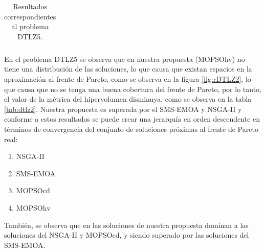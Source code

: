 \begin{table}
\begin{center}
\begin{tabular}{|l|cc|cc|}
	\end{tabular}
\caption{Resultados correspondientes al problema DTLZ5.}
  \label{tab:dtlz5}
\end{center}
\end{table}

En el problema DTLZ5 se observa que en nuestra propuesta (MOPSOhv) no tiene una distribuci\'on de las soluciones, lo que causa que existan 
espacios en la aproximaci\'on al frente de Pareto, como se observa en la figura \ref{fig:rDTLZ2}, lo que causa que no se tenga una buena 
cobertura del frente de Pareto, por lo tanto, el valor de la m\'etrica del hipervolumen disminuya, como se observa en la tabla \ref{tab:dtlz2}. 
Nuestra propuesta es superada por el SMS-EMOA y NSGA-II y conforme a estos resultados se puede crear una jerarqu\'ia en orden descendente en t\'erminos de convergencia del conjunto de 
soluciones pr\'oximas al frente de Pareto real:


\begin{enumerate}
  \item NSGA-II
  \item SMS-EMOA
  \item MOPSOcd
  \item MOPSOhv
\end{enumerate}

Tambi\'en, se observa que en las soluciones de nuestra propuesta dominan a las soluciones del NSGA-II y MOPSOcd, y siendo superado por las 
soluciones del SMS-EMOA.


